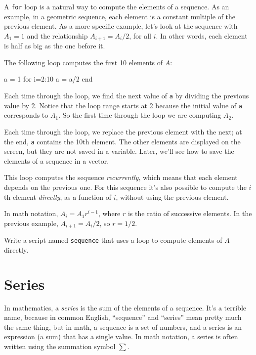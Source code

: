 
A {\tt for} loop is a natural way to compute the elements of a sequence.
As an example, in a geometric sequence, each element is a constant
multiple of the previous element.  As a more specific example, let's
look at the sequence with $A_1 = 1$ and the relationship $A_{i+1} = A_i/2$,
for all $i$.  In other words, each element is half as big as the one before it.

The following loop computes the first 10 elements of $A$:

\begin{code}
a = 1
for i=2:10
    a = a/2
end
\end{code}

Each time through the loop, we find the next value of {\tt a}
by dividing the previous value by 2.  Notice that the loop
range starts at 2 because the initial value of {\tt a} corresponds
to $A_1$.  So the first time through the loop we are computing
$A_2$.

Each time through the loop, we replace the previous element with
the next; at the end, {\tt a} contains the 10th element.  The
other elements are displayed on the screen, but they are not saved
in a variable.  Later, we'll see how to save the elements
of a sequence in a vector.


This loop computes the sequence \emph{recurrently}, which means
that each element depends on the previous one.
For this sequence it's also possible to compute the $i$th element
\emph{directly}, as a function of $i$, without using the previous element.

In math notation, $A_i = A_1 r^{i-1}$, where $r$ is the ratio of successive elements.
In the previous example, $A_{i+1} = A_i/2$, so $r = 1/2$.

\begin{ex}
Write a script named {\tt sequence} that uses a loop to 
compute elements of $A$ directly.
\end{ex}


\section{Series}
\label{series}

In mathematics, a \emph{series} is the sum of the elements of
a sequence.  It's a terrible name, because in common English,
``sequence'' and ``series'' mean pretty much the same thing, but in
math, a sequence is a set of numbers, and a series is an expression
(a sum) that has a single value.  In math notation, a series
is often written using the summation symbol $\sum$.

